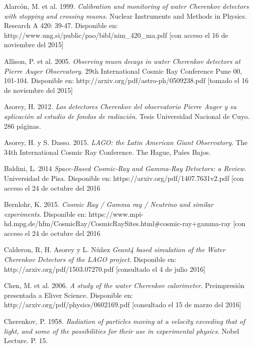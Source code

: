 \documentclass{book}
\begin{document}
\Biblio
\begin{thebibliography}{9}
\Bibliotoc
{} Alarc\'on, M. et al. 1999. \textit{Calibration and monitoring of water Cherenkov detectors with stopping and crossing muons}. Nuclear Instruments and Methods in Physics. Research A 420: 39-47. Disponible en: http://www.ung.si/public/pao/bibl/nim\_420\_ma.pdf [con acceso el 16 de noviembre del 2015]

 Allison, P. et al. 2005. \textit{Observing muon decays in water Cherenkov detectors at Pierre Auger Observatory}. 29th International Cosmic Ray Conference Pune 00, 101-104. Disponible en: http://arxiv.org/pdf/astro-ph/0509238.pdf [tomado el 16 de noviembre del 2015]


 Asorey, H. 2012. \textit{Los detectores Cherenkov del observatorio Pierre Auger y su aplicaci\'on al estudio de fondos de radiaci\'on}. Tesis Universidad Nacional de Cuyo. 286 p\'aginas.

 Asorey, H. y S. Dasso. 2015. \textit{LAGO: the Latin American Giant Observatory}. The 34th International Cosmic Ray Conference. The Hague, Pa\'ses Bajos.

 Baldini, L. 2014 \textit{Space-Based Cosmic-Ray and Gamma-Ray Detectors: a Review}. Universidad de Pisa. Disponible en: https://arxiv.org/pdf/1407.7631v2.pdf [con acceso el 24 de octubre del 2016

 Bernlohr, K. 2015. \textit{Cosmic Ray / Gamma ray / Neutrino and similar experiments}. Disponible en: https://www.mpi-hd.mpg.de/hfm/CosmicRay/CosmicRaySites.html\#cosmic-ray+gamma-ray [con acceso el 24 de octubre del 2016

 Calderon, R, H. Asorey y L. N\'u\~nez \textit{Geant4 based simulation of the Water Cherenkov Detectors of the LAGO project}. Disponible en: http://arxiv.org/pdf/1503.07270.pdf [consultado el 4 de julio 2016]

 Chen, M. et al. 2006. \textit{A study of the water Cherenkov calorimeter}. Preimpresión presentada a Eliver Science. Disponible en: http://arxiv.org/pdf/physics/0602169.pdf [consultado el 15 de marzo del 2016]

 Cherenkov, P. 1958. \textit{Radiation of particles moving at a velocity exceeding that of light, and some of the possibilities for their use in experimental physics}. Nobel Lecture. P. 15.


\end{thebibliography}
\end{document}
